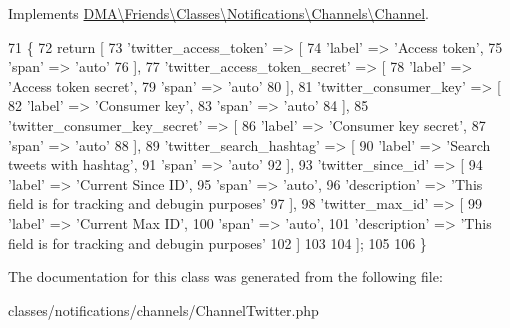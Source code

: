 Implements \hyperlink{interfaceDMA_1_1Friends_1_1Classes_1_1Notifications_1_1Channels_1_1Channel_aa473115fa58a6fa5f57a9069f23dd771}{D\+M\+A\textbackslash{}\+Friends\textbackslash{}\+Classes\textbackslash{}\+Notifications\textbackslash{}\+Channels\textbackslash{}\+Channel}.


\begin{DoxyCode}
71     \{
72         \textcolor{keywordflow}{return} [
73             \textcolor{stringliteral}{'twitter\_access\_token'} => [
74                 \textcolor{stringliteral}{'label'} => \textcolor{stringliteral}{'Access token'},
75                 \textcolor{stringliteral}{'span'}  => \textcolor{stringliteral}{'auto'}
76             ],
77             \textcolor{stringliteral}{'twitter\_access\_token\_secret'} => [
78                 \textcolor{stringliteral}{'label'} => \textcolor{stringliteral}{'Access token secret'},
79                 \textcolor{stringliteral}{'span'}  => \textcolor{stringliteral}{'auto'}
80             ],
81             \textcolor{stringliteral}{'twitter\_consumer\_key'} => [
82                 \textcolor{stringliteral}{'label'} => \textcolor{stringliteral}{'Consumer key'},
83                 \textcolor{stringliteral}{'span'}  => \textcolor{stringliteral}{'auto'}
84             ],
85             \textcolor{stringliteral}{'twitter\_consumer\_key\_secret'} => [
86                 \textcolor{stringliteral}{'label'} => \textcolor{stringliteral}{'Consumer key secret'},
87                 \textcolor{stringliteral}{'span'}  => \textcolor{stringliteral}{'auto'}
88             ],
89             \textcolor{stringliteral}{'twitter\_search\_hashtag'} => [
90                 \textcolor{stringliteral}{'label'} => \textcolor{stringliteral}{'Search tweets with hashtag'},
91                 \textcolor{stringliteral}{'span'}  => \textcolor{stringliteral}{'auto'}
92             ],
93             \textcolor{stringliteral}{'twitter\_since\_id'} => [
94                 \textcolor{stringliteral}{'label'} => \textcolor{stringliteral}{'Current Since ID'},
95                 \textcolor{stringliteral}{'span'}  => \textcolor{stringliteral}{'auto'},
96                 \textcolor{stringliteral}{'description'} => \textcolor{stringliteral}{'This field is for tracking and debugin purposes'}
97             ],
98             \textcolor{stringliteral}{'twitter\_max\_id'} => [
99                 \textcolor{stringliteral}{'label'} => \textcolor{stringliteral}{'Current Max ID'},
100                 \textcolor{stringliteral}{'span'}  => \textcolor{stringliteral}{'auto'},
101                 \textcolor{stringliteral}{'description'} => \textcolor{stringliteral}{'This field is for tracking and debugin purposes'}
102             ]
103 
104         ];
105 
106     \}
\end{DoxyCode}


The documentation for this class was generated from the following file\+:\begin{DoxyCompactItemize}
\item 
classes/notifications/channels/Channel\+Twitter.\+php\end{DoxyCompactItemize}
